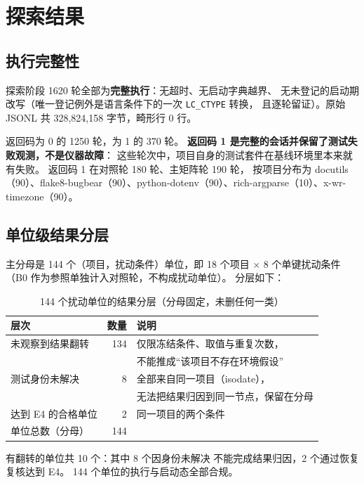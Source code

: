 \documentclass[11pt]{ctexart}
\begin{document}
\section{探索结果}

\subsection{执行完整性}

探索阶段 1620 轮全部为\textbf{完整执行}：无超时、无启动字典越界、
无未登记的启动期改写（唯一登记例外是语言条件下的一次 \texttt{LC\_CTYPE} 转换，
且逐轮留证）。原始 JSONL 共 328,824,158 字节，畸形行 0 行。

返回码为 0 的 1250 轮，为 1 的 370 轮。
\textbf{返回码 1 是完整的会话并保留了测试失败观测，不是仪器故障}：
这些轮次中，项目自身的测试套件在基线环境里本来就有失败。
返回码 1 在对照轮 180 轮、主矩阵轮 190 轮，
按项目分布为 docutils（90）、flake8-bugbear（90）、python-dotenv（90）、rich-argparse（10）、x-wr-timezone（90）。

\subsection{单位级结果分层}

主分母是 144 个（项目，扰动条件）单位，即 18 个项目 ×
8 个单键扰动条件（B0 作为参照单独计入对照轮，不构成扰动单位）。
分层如下：

\begin{table}[h]
\centering
\caption{144 个扰动单位的结果分层（分母固定，未删任何一类）}
\begin{tabular}{lrl}
\toprule
层次 & 数量 & 说明 \\
\midrule
未观察到结果翻转 & 134 & 仅限冻结条件、取值与重复次数，\\
                  &              & 不能推成“该项目不存在环境假设” \\
测试身份未解决   & 8 & 全部来自同一项目（isodate），\\
                  &              & 无法把结果归因到同一节点，保留在分母 \\
达到 E4 的合格单位 & 2 & 同一项目的两个条件 \\
\midrule
单位总数（分母） & 144 & \\
\bottomrule
\end{tabular}
\end{table}

有翻转的单位共 10 个：其中 8 个因身份未解决
不能完成结果归因，2 个通过恢复复核达到 E4。
144 个单位的执行与启动态全部合规。
\end{document}
